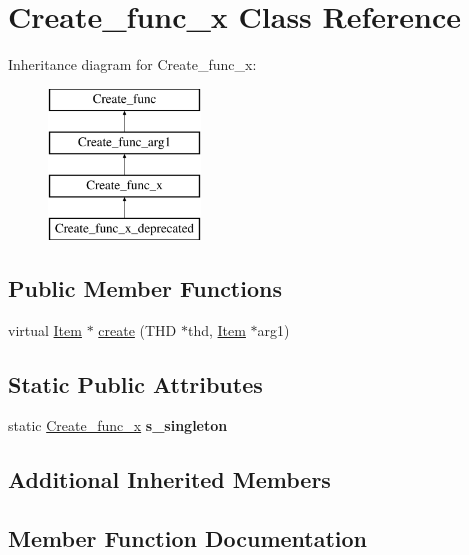 \hypertarget{classCreate__func__x}{}\section{Create\+\_\+func\+\_\+x Class Reference}
\label{classCreate__func__x}
Inheritance diagram for Create\+\_\+func\+\_\+x\+:\begin{figure}[H]
\begin{center}
\leavevmode
\includegraphics[height=4.000000cm]{classCreate__func__x}
\end{center}
\end{figure}
\subsection*{Public Member Functions}
\begin{DoxyCompactItemize}
\item 
virtual \mbox{\hyperlink{classItem}{Item}} $\ast$ \mbox{\hyperlink{classCreate__func__x_a3e8336dedac36c41fd771cc35049ddbe}{create}} (T\+HD $\ast$thd, \mbox{\hyperlink{classItem}{Item}} $\ast$arg1)
\end{DoxyCompactItemize}
\subsection*{Static Public Attributes}
\begin{DoxyCompactItemize}
\item 
\mbox{\label{classCreate__func__x_a5c7e9afece3d5fdde090565f93ba0a18}} 
static \mbox{\hyperlink{classCreate__func__x}{Create\+\_\+func\+\_\+x}} {\bfseries s\+\_\+singleton}
\end{DoxyCompactItemize}
\subsection*{Additional Inherited Members}


\subsection{Member Function Documentation}
\mbox{\label{classCreate__func__x_a3e8336dedac36c41fd771cc35049ddbe}} 
